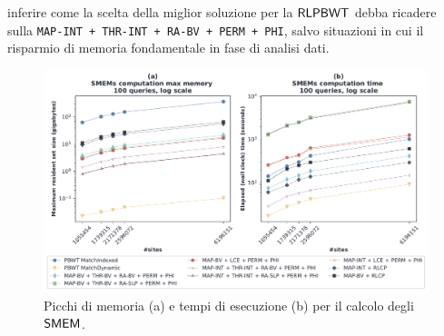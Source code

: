inferire come la scelta della miglior soluzione per la 
$\mbox{\rm {\sf RLPBWT}}$ debba ricadere sulla \texttt{MAP-INT + THR-INT + RA-BV + PERM +
  PHI}, salvo situazioni in cui il risparmio di memoria
fondamentale in fase di analisi dati. 
\begin{figure}
  \centering
  \includegraphics[width=\linewidth]{img/exe_time_mem_paper}
  \caption{Picchi di memoria (a) e tempi di esecuzione (b) per il calcolo degli
    $\mbox{\rm {\sf SMEM}}$.}
  \label{fig:smemtimememchr}
\end{figure}
